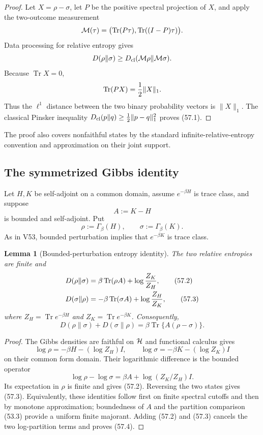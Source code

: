 \documentclass[11pt]{article}
\newtheorem{lemma}[theorem]{Lemma}
\theoremstyle{remark}
\begin{document}
\begin{proof}
Let \(X=\rho-\sigma\), let \(P\) be the positive spectral projection
of \(X\), and apply the two-outcome measurement
\[
 {\cal M}(\tau)
 =
 \bigl(\operatorname{Tr}(P\tau),
       \operatorname{Tr}((I-P)\tau)\bigr).
\]
Data processing for relative entropy gives
\[
 D(\rho\|\sigma)\geq
 D_{\rm cl}({\cal M}\rho\|{\cal M}\sigma).
\]
Because \(\operatorname{Tr}X=0\),
\[
 \operatorname{Tr}(PX)={1\over2}\|X\|_1.
\]
Thus the \(\ell^1\) distance between the two binary probability
vectors is \(\|X\|_1\).  The classical Pinsker inequality
\(D_{\rm cl}(p\|q)\geq\frac12\|p-q\|_1^2\) proves (57.1).
\end{proof}

The proof also covers nonfaithful states by the standard
infinite-relative-entropy convention and approximation on their
joint support.

\subsection{The symmetrized Gibbs identity}

Let \(H,K\) be self-adjoint on a common domain, assume
\(e^{-\beta H}\) is trace class, and suppose
\[
                         A:=K-H
\]
is bounded and self-adjoint.  Put
\[
 \rho:=\Gamma_\beta(H),\qquad
 \sigma:=\Gamma_\beta(K).
\]
As in V53, bounded perturbation implies that \(e^{-\beta K}\) is
trace class.

\begin{lemma}[Bounded-perturbation entropy identity]
\label{lem:v12v57-entropy-identity}
The two relative entropies are finite and
\begin{align}
 D(\rho\|\sigma)
 &=
 \beta\operatorname{Tr}(\rho A)
 +\log{Z_K\over Z_H},                             \tag{57.2}\\
 D(\sigma\|\rho)
 &=
 -\beta\operatorname{Tr}(\sigma A)
 +\log{Z_H\over Z_K},                             \tag{57.3}
\end{align}
where \(Z_H=\operatorname{Tr}e^{-\beta H}\) and
\(Z_K=\operatorname{Tr}e^{-\beta K}\).  Consequently,
\begin{equation}
 D(\rho\|\sigma)+D(\sigma\|\rho)
 =
 \beta\operatorname{Tr}\{A(\rho-\sigma)\}.        \tag{57.4}
\end{equation}
\end{lemma}

\begin{proof}
The Gibbs densities are faithful on \({\cal H}\) and functional
calculus gives
\[
 \log\rho=-\beta H-(\log Z_H)I,\qquad
 \log\sigma=-\beta K-(\log Z_K)I
\]
on their common form domain.  Their logarithmic difference is the
bounded operator
\[
 \log\rho-\log\sigma
 =
 \beta A+\log(Z_K/Z_H)I.
\]
Its expectation in \(\rho\) is finite and gives (57.2).  Reversing
the two states gives (57.3).  Equivalently, these identities follow
first on finite spectral cutoffs and then by monotone approximation;
boundedness of \(A\) and the partition comparison (53.3) provide a
uniform finite majorant.  Adding (57.2) and (57.3) cancels the two
log-partition terms and proves (57.4).
\end{proof}
\end{document}
